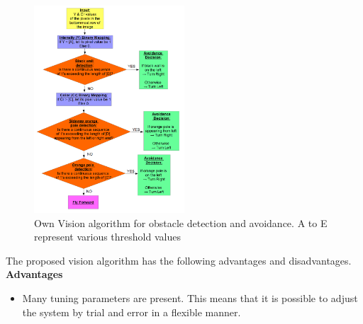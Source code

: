 \begin{figure}[H]
	\centering
	\includegraphics[width = 0.5\textwidth]{Figures/vision.png}
	\caption{Own Vision algorithm for obstacle detection and avoidance. A to E represent various threshold values}
	\label{own_vision}
\end{figure}

The proposed vision algorithm has the following advantages and disadvantages.\\

\textbf{Advantages}
\begin{itemize}
	\item Many tuning parameters are present. This means that it is possible to adjust the system by trial and error in a flexible manner.
\end{itemize}